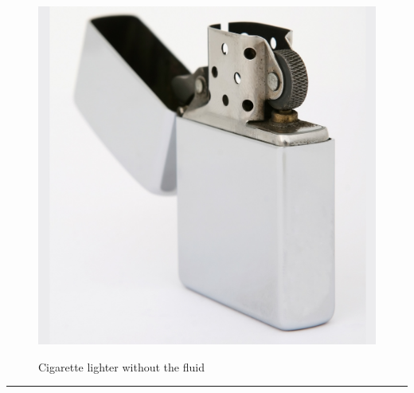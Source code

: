 \documentclass{article}
\begin{document}
    \begin{figure}[H]
        \centering
        \begin{minipage}{0.25\textwidth}
            \centering
            \includegraphics[width=\textwidth]{../SurvivalItemImages/lighter}
        \end{minipage}\hfill
        \begin{minipage}{0.7\textwidth}
            \centering
            \Large Cigarette lighter without the fluid
        \end{minipage}
    \end{figure}
    \vspace{-0.8em}
    \noindent\rule{\textwidth}{0.4pt}
            
\end{document}
